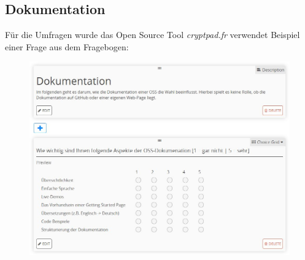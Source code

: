 \subsection{Dokumentation}
Für die Umfragen wurde das Open Source Tool \textit{cryptpad.fr} verwendet
Beispiel einer Frage aus dem Fragebogen:
\begin{figure}[h]
    \centering
    \includegraphics[scale=0.6]{figures/anhang/Frage_2.JPG}
\end{figure}


